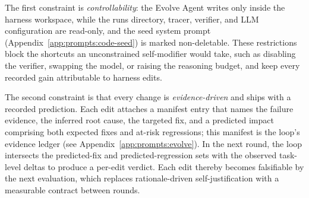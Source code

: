The first constraint is \textit{controllability}: the Evolve Agent writes only inside the harness workspace, while the runs directory, tracer, verifier, and LLM configuration are read-only, and the seed system prompt (Appendix~\ref{app:prompts:code-seed}) is marked non-deletable.
These restrictions block the shortcuts an unconstrained self-modifier would take, such as disabling the verifier, swapping the model, or raising the reasoning budget, and keep every recorded gain attributable to harness edits.

The second constraint is that every change is \textit{evidence-driven} and ships with a recorded prediction.
Each edit attaches a manifest entry that names the failure evidence, the inferred root cause, the targeted fix, and a predicted impact comprising both expected fixes and at-risk regressions; this manifest is the loop's evidence ledger (see Appendix~\ref{app:prompts:evolve}).
In the next round, the loop intersects the predicted-fix and predicted-regression sets with the observed task-level deltas to produce a per-edit verdict.
Each edit thereby becomes falsifiable by the next evaluation, which replaces rationale-driven self-justification with a measurable contract between rounds.





